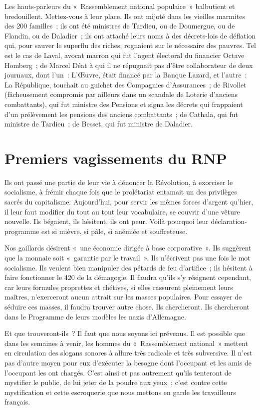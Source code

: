 \documentclass[french,twoside]{book} %
\newcommand\chaptercont{} %
\begin{document}
\chaptercont
\noindent Les hauts-parleurs du « Rassemblement national populaire » balbutient et bredouillent. Mettez-vous à leur place. Ils ont mijoté dans les vieilles marmites des 200 familles ; ils ont été ministres de Tardieu, ou de Doumergue, ou de Flandin, ou de Daladier ; ils ont attaché leurs noms à des décrets-lois de déflation qui, pour sauver le superflu des riches, rognaient sur le nécessaire des pauvres. Tel est le cas de Laval, avocat marron qui fut l’agent électoral du financier Octave Homberg ; de Marcel Déat à qui il ne répugnait pas d’être collaborateur de deux journaux, dont l’un : L’Œuvre, était financé par la Banque Lazard, et l’autre : La République, touchait au guichet des Compagnies d’Assurances ; de Rivollet (fâcheusement compromis par ailleurs dans un scandale de Loterie d’anciens combattants), qui fut ministre des Pensions et signa les décrets qui frappaient d’un prélèvement les pensions des anciens combattants ; de Cathala, qui fut ministre de Tardieu ; de Besset, qui fut ministre de Daladier.\par
\section[{Premiers vagissements du RNP}]{Premiers vagissements du RNP}
\noindent Ils ont passé une partie de leur vie à dénoncer la Révolution, à exorciser le socialisme, à frémir chaque fois que le prolétariat entamait un des privilèges sacrés du capitalisme. Aujourd’hui, pour servir les mêmes forces d’argent qu’hier, il leur faut modifier du tout au tout leur vocabulaire, se couvrir d’une vêture nouvelle. Ils bégaient, ils hésitent, ils ont peur. Voilà pourquoi leur déclaration-programme est si mièvre, si pâle, si anémiée et souffreteuse.\par
Nos gaillards désirent « une économie dirigée à base corporative ». Ils suggèrent que la monnaie soit « garantie par le travail ». Ils n’écrivent pas une fois le mot socialisme. Ils veulent bien manipuler des pétards de feu d’artifice ; ils hésitent à faire fonctionner le 420 de la démagogie. Il faudra qu’ils s’y résignent cependant, car leurs formules proprettes et chétives, si elles rassurent pleinement leurs maîtres, n’exerceront aucun attrait sur les masses populaires. Pour essayer de séduire ces masses, il faudra trouver autre chose. Ils chercheront. Ils chercheront dans le Programme de leurs modèles les nazis d’Allemagne.\par
Et que trouveront-ils ? Il faut que nous soyons ici prévenus. Il est possible que dans les semaines à venir, les hommes du « Rassemblement national » mettent en circulation des slogans sonores à allure très radicale et très subversive. Il n’est pas d’autre moyen pour eux d’exécuter la besogne dont l’occupant et les amis de l’occupant les ont chargés. C’est ainsi et pas autrement qu’ils tenteront de mystifier le public, de lui jeter de la poudre aux yeux ; c’est contre cette mystification et cette escroquerie que nous mettons en garde les travailleurs français.
\end{document}
